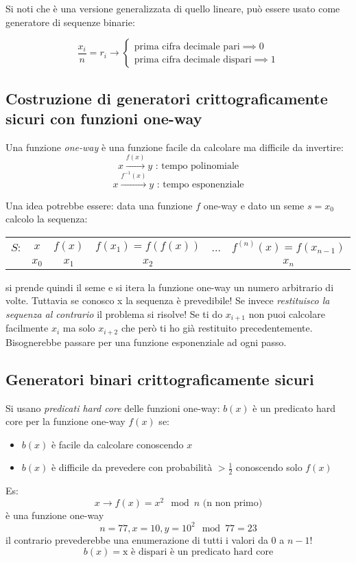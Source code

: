 Si noti che è una versione generalizzata di quello lineare, può essere usato come generatore di sequenze binarie:

\begin{equation}
    \frac{x_{i}}{n} = r_{i} \longrightarrow
    \begin{cases}
        \text{prima cifra decimale pari} \implies 0 \\
        \text{prima cifra decimale dispari} \implies 1
    \end{cases}
\end{equation}

\subsection{Costruzione di generatori crittograficamente sicuri con funzioni one-way}
Una funzione \emph{one-way} è una funzione facile da calcolare ma difficile da invertire:
$$ x \xrightarrow{f(x)} y \text{ : tempo polinomiale} $$
$$ x \xrightarrow{f^{-1}(x)} y \text{ : tempo esponenziale} $$

Una idea potrebbe essere: data una funzione $f$ one-way e dato un seme $s = x_{0}$ calcolo la sequenza:
\begin{table}[!ht]
    \centering
    \begin{tabular}{c | c c c c c}
        $S$: & $x$ & $f(x)$ & $f(x_{1}) = f(f(x))$ & ... & $f^{(n)}(x) = f(x_{n-1})$ \\
         & $x_{0}$ & $x_{1}$ & $x_{2}$ & & $x_{n}$ \\
    \end{tabular}
\end{table}

si prende quindi il seme e si itera la funzione one-way un numero arbitrario di volte. Tuttavia se conosco x la sequenza è prevedibile! Se invece \emph{restituisco la sequenza al contrario} il problema si risolve! Se ti do $x_{i+1}$ non puoi calcolare facilmente $x_{i}$ ma solo $x_{i+2}$ che però ti ho già restituito precedentemente. Bisognerebbe passare per una funzione esponenziale ad ogni passo.

\subsection{Generatori binari crittograficamente sicuri}
Si usano \emph{predicati hard core} delle funzioni one-way: $b(x)$ è un predicato hard core per la funzione one-way $f(x)$ se:
\begin{itemize}
    \item $b(x)$ è facile da calcolare conoscendo $x$
    \item $b(x)$ è difficile da prevedere con probabilità $> \frac{1}{2}$ conoscendo solo $f(x)$
\end{itemize}
Es:
$$ x \xrightarrow{} f(x) = x^2 \mod n \text{ (n non primo)} $$
è una funzione one-way
$$ n = 77, x = 10, y = 10^{2} \mod 77 = 23 $$
il contrario prevederebbe una enumerazione di tutti i valori da 0 a $n-1$!
$$ b(x) = \text{x è dispari} \text{ è un predicato hard core} $$

